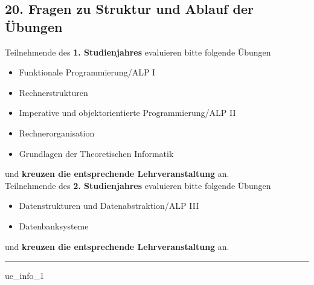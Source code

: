 \documentclass[a4paper,10pt]{article}
\makeatletter
\def\saveenum{\xdef\@savedenum{\the\c@enumi\relax}}
\makeatother
\begin{document}
{\begin{enumerate}
\end{enumerate} \saveenum

\vspace{-1cm}


\pagebreak



\subsection*{20. Fragen zu Struktur und Ablauf der Übungen}

Teilnehmende des \textbf{1. Studienjahres} evaluieren bitte folgende Übungen
\begin{itemize}
	\item Funktionale Programmierung/ALP I
	\item Rechnerstrukturen
	\item Imperative und objektorientierte Programmierung/ALP II
	\item Rechnerorganisation
	\item Grundlagen der Theoretischen Informatik
\end{itemize}
und \textbf{kreuzen die entsprechende Lehrveranstaltung} an. \\

Teilnehmende des \textbf{2. Studienjahres} evaluieren bitte folgende Übungen
\begin{itemize}
	\item Datenstrukturen und Datenabstraktion/ALP III
	\item Datenbanksysteme
\end{itemize}
und \textbf{kreuzen die entsprechende Lehrveranstaltung} an.

\vspace{.5cm}
\noindent\rule{\textwidth}{1pt}
\vspace{0.5cm}

\begin{questionmult}{ue_info_1}
	\begin{choices}
	\end{choices}
\end{questionmult}


 \\

}
\end{document}
